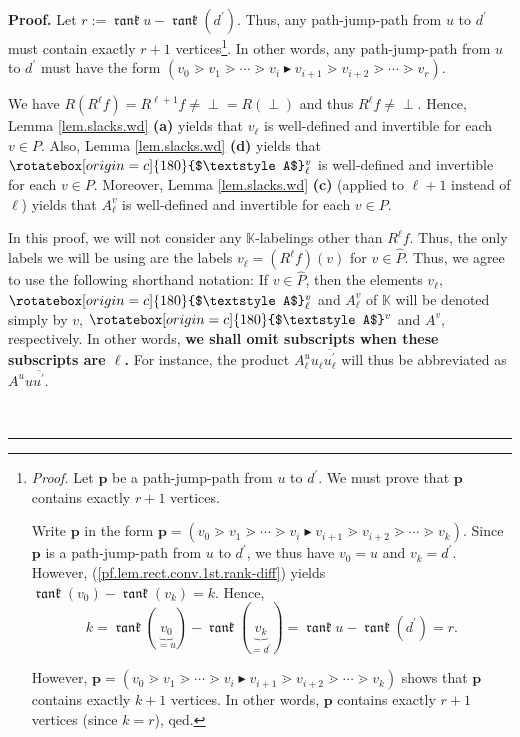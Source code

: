 \documentclass[numbers=enddot,12pt,final,onecolumn,notitlepage]{scrartcl}%
\theoremstyle{definition}
\newenvironment{verlong}{}{}
\newcommand{\undf}{\operatorname*{\bot}}
\newcommand{\upslack}{\mathchoice{\rotatebox[origin=c]{180}{$\displaystyle A$}}{\rotatebox[origin=c]{180}{$\textstyle A$}}{\rotatebox[origin=c]{180}{$\scriptstyle A$}}{\rotatebox[origin=c]{180}{$\scriptscriptstyle A$}}}
\newcommand{\downslack}{A}
\DeclareMathOperator{\rank}{\mathfrak{rank}}
\newenvironment{proof}[1][Proof]{\noindent\textbf{#1.} }{\ \rule{0.5em}{0.5em}}
\begin{document}
\begin{proof}
\begin{verlong}
Let $r:=\rank u-\rank \left(  d^{\prime}\right)  $. Thus, any path-jump-path
from $u$ to $d^{\prime}$ must contain exactly $r+1$
vertices\footnote{\textit{Proof.} Let $\mathbf{p}$ be a path-jump-path from
$u$ to $d^{\prime}$. We must prove that $\mathbf{p}$ contains exactly $r+1$
vertices.
\par
Write $\mathbf{p}$ in the form $\mathbf{p}=\left(  v_{0}\gtrdot v_{1}%
\gtrdot\cdots\gtrdot v_{i}\blacktriangleright v_{i+1}\gtrdot v_{i+2}%
\gtrdot\cdots\gtrdot v_{k}\right)  $. Since $\mathbf{p}$ is a path-jump-path
from $u$ to $d^{\prime}$, we thus have $v_{0}=u$ and $v_{k}=d^{\prime}$.
However, (\ref{pf.lem.rect.conv.1st.rank-diff}) yields $\rank \left(
v_{0}\right)  -\rank \left(  v_{k}\right)  =k$. Hence,%
\[
k=\rank \left(  \underbrace{v_{0}}_{=u}\right)  -\rank \left(
\underbrace{v_{k}}_{=d^{\prime}}\right)  =\rank u-\rank \left(  d^{\prime
}\right)  =r.
\]
\par
However, $\mathbf{p}=\left(  v_{0}\gtrdot v_{1}\gtrdot\cdots\gtrdot
v_{i}\blacktriangleright v_{i+1}\gtrdot v_{i+2}\gtrdot\cdots\gtrdot
v_{k}\right)  $ shows that $\mathbf{p}$ contains exactly $k+1$ vertices. In
other words, $\mathbf{p}$ contains exactly $r+1$ vertices (since $k=r$),
qed.}. In other words, any path-jump-path from $u$ to $d^{\prime}$ must have
the form $\left(  v_{0}\gtrdot v_{1}\gtrdot\cdots\gtrdot v_{i}%
\blacktriangleright v_{i+1}\gtrdot v_{i+2}\gtrdot\cdots\gtrdot v_{r}\right)  $.
\end{verlong}

We have $R\left(  R^{\ell}f\right)  =R^{\ell+1}f\neq\undf=R\left(
\undf\right)  $ and thus $R^{\ell}f\neq\undf$. Hence, Lemma
\ref{lem.slacks.wd} \textbf{(a)} yields that $v_{\ell}$ is well-defined and
invertible for each $v\in P$. Also, Lemma \ref{lem.slacks.wd} \textbf{(d)}
yields that $\upslack_{\ell}^{v}$ is well-defined and invertible for each
$v\in P$. Moreover, Lemma \ref{lem.slacks.wd} \textbf{(c)} (applied to
$\ell+1$ instead of $\ell$) yields that $\downslack_{\ell}^{v}$ is
well-defined and invertible for each $v\in P$.

In this proof, we will not consider any $\mathbb{K}$-labelings other than
$R^{\ell}f$. Thus, the only labels we will be using are the labels $v_{\ell
}=\left(  R^{\ell}f\right)  \left(  v\right)  $ for $v\in\widehat{P}$. Thus,
we agree to use the following shorthand notation: If $v\in\widehat{P}$, then
the elements $v_{\ell}$, $\upslack_{\ell}^{v}$ and $\downslack_{\ell}^{v}$ of
$\mathbb{K}$ will be denoted simply by $v$, $\upslack^{v}$ and $\downslack^{v}%
$, respectively. In other words, \textbf{we shall omit subscripts when these
subscripts are $\ell$.} For instance, the product $\downslack_{\ell}%
^{u}u_{\ell}\overline{u_{\ell}^{\prime}}$ will thus be abbreviated as
$\downslack^{u}u\overline{u^{\prime}}$.


\end{proof}
\end{document}
